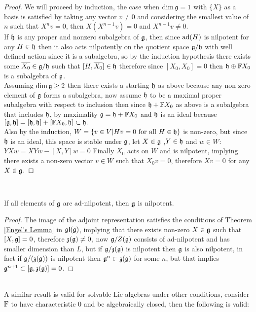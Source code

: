 \begin{proof}
	We will proceed by induction, the case when $\dim \mathfrak{g} = 1$ with $\{X\}$ as a basis is satisfied by taking any vector $v\not=0$ and considering the smallest value of $n$ such that $X^nv=0$, then $X(X^{n-1}v) = 0$ and $X^{n-1}v \not= 0$.\\
	If $\mathfrak{h}$ is any proper and nonzero subalgebra of $\mathfrak{g}$, then since $\text{ad}(H)$ is nilpotent for any $H \in \mathfrak{h}$ then it also acts nilpotently on the quotient space $\mathfrak{g}/\mathfrak{h}$ with well defined action since it is a subalgebra, so by the induction hypothesis there exists some $\overline{X_0} \in \mathfrak{g}/\mathfrak{h}$ such that $[H,\overline{X_0}] \in \mathfrak{h}$ therefore since $[X_0,X_0]=0$ then $\mathfrak{h} \oplus \mathbb{F} X_0$ is a subalgebra of $\mathfrak{g}$.\\
	Assuming $\dim \mathfrak{g}\ge2$ then there exists a starting $\mathfrak{h}$ as above because any non-zero element of $\mathfrak{g}$ forms a subalgebra, now assume  $\mathfrak{h}$ to be a maximal proper subalgebra with respect to inclusion then since $\mathfrak{h} + \mathbb{F} X_0$ as above is a subalgebra that includes $\mathfrak{h}$, by maximality $\mathfrak{g} = \mathfrak{h} + \mathbb{F} X_0$ and $\mathfrak{h}$ is an ideal because $[\mathfrak{g},\mathfrak{h}] = [\mathfrak{h},\mathfrak{h}]+ [\mathbb{F} X_0,\mathfrak{h}] \subset \mathfrak{h}.$\\
	Also by the induction, $W=\{v \in V|Hv = 0 \text{ for all } H \in \mathfrak{h}\}$ is non-zero, but since $\mathfrak{h}$ is an ideal, this space is stable under $\mathfrak{g}$, let $X \in \mathfrak{g}$ ,$Y \in \mathfrak{h}$ and $w \in W$:
	$YXw = XYw - [X,Y]w = 0$
	Finally $X_0$ acts on $W$ and is nilpotent, implying there exists a non-zero vector $v \in W$ such that $X_0v=0$, therefore $X v = 0$ for any $X \in \mathfrak{g}$.
\end{proof}\\
\begin{teo}
If all elements of $\mathfrak{g}$ are ad-nilpotent, then $\mathfrak{g}$ is nilpotent.
\label{Engel's Theorem}
\end{teo}
\begin{proof}
The image of the adjoint representation satisfies the conditions of Theorem \ref{Engel's Lemma} in $\mathfrak{gl}(\mathfrak{g})$, implying that there exists non-zero $X \in \mathfrak{g}$ such that $[X,\mathfrak{g}]=0$, therefore $\mathfrak{z}(\mathfrak{g})\not=0$, now $\mathfrak{g}/Z(\mathfrak{g})$ consists of ad-nilpotent and has smaller dimension than $L$, but if $\mathfrak{g}/\mathfrak{z}(\mathfrak{g})$ is nilpotent then $\mathfrak{g}$ is also nilpotent, in fact if $\mathfrak{g}/(\mathfrak{z}(\mathfrak{g}))$ is nilpotent then $\mathfrak{g}^n \subset \mathfrak{z}(\mathfrak{g})$ for some $n$, but that implies $\mathfrak{g}^{n+1} \subset [\mathfrak{g},\mathfrak{z}(\mathfrak{g})] = 0$.
\end{proof}\\
A similar result is valid for solvable Lie algebras under other conditions, consider $\mathbb{F}$ to have characteristic $0$ and be algebraically closed, then the following is valid:
